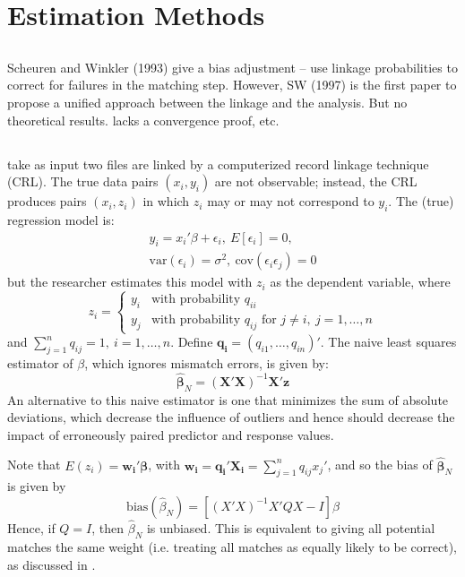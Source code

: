 \documentclass[12pt]{article}
\begin{document}
\section{Estimation Methods}

\subsection{\cite{sw1997}}

Scheuren and Winkler (1993) give a bias adjustment -- use linkage probabilities to correct for failures in the matching step.  However, SW (1997) is the first paper to propose a unified approach between the linkage and the analysis.  But no theoretical results. lacks a convergence proof, etc. 

\subsection{\cite{lahiri05}}
\cite{lahiri05} take as input two files are linked by a computerized record linkage technique (CRL).  The true data pairs $(x_i, y_i)$ are not observable; instead, the CRL produces pairs $(x_i, z_i)$ in which $z_i$ may or may not correspond to $y_i$.  The (true) regression model is:
\begin{gather*}y_i = x_i'\beta + \epsilon_i,\ E[\epsilon_i] = 0,\\ \text{var}(\epsilon_i) = \sigma^2,\ \text{cov}(\epsilon_i \epsilon_j) = 0 \end{gather*}
but the researcher estimates this model with $z_i$ as the dependent variable, where $$z_i = \begin{cases} y_i & \text{with probability $q_{ii}$} \\ y_j & \text{with probability $q_{ij}$ for $j\neq i,\ j = 1,\dots,n $} \end{cases}$$ 
and $\sum_{j=1}^n q_{ij} = 1, \ i=1,\dots, n$.  Define $\mathbf{q_i} = (q_{i1}, \dots, q_{in})'$.  The naive least squares estimator of $\beta$, which ignores mismatch errors, is given by:
$$\hat{\mathbf{\beta}}_N = (\mathbf{X'X})^{-1} \mathbf{X'z} $$ 
An alternative to this naive estimator is one that minimizes the sum of absolute deviations, which decrease the influence of outliers and hence should decrease the impact of erroneously paired predictor and response values.  

Note that $E(z_i) = \mathbf{w_i'\beta}$, with $\mathbf{w_i = q_i'X_i} = \sum_{j=1}^n q_{ij} x_j' $, and so the bias of $\hat{\mathbf{\beta}}_N $ is given by
$$\text{bias}(\hat{\beta}_N) = [(X'X)^{-1} X'QX - I] \beta $$ 
Hence, if $Q = I$, then $\hat{\beta}_N$ is unbiased.  This is equivalent to giving all potential matches the same weight (i.e. treating all matches as equally likely to be correct), as discussed in \cite{ahl2019}.  
\end{document}
